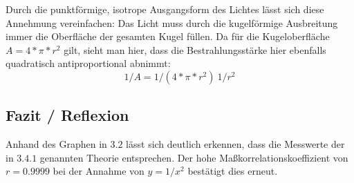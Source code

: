\documentclass[12pt, a4paper]{article}
\begin{document}
Durch die punktförmige, isotrope Ausgangsform des Lichtes lässt sich diese Annehmung vereinfachen:
Das Licht muss durch die kugelförmige Ausbreitung immer die Oberfläche der gesamten Kugel füllen. Da für die Kugeloberfläche $A=4*\pi*r^2$ gilt, sieht man hier, dass die Bestrahlungsstärke hier ebenfalls quadratisch antiproportional abnimmt:
$$1/A = 1/(4 * \pi * r^2) ~ 1/r^2$$

\subsection{Fazit / Reflexion}
Anhand des Graphen in $3.2$ lässt sich deutlich erkennen, dass die Messwerte der in $3.4.1$ genannten Theorie entsprechen.
Der hohe Maßkorrelationskoeffizient von $r = 0.9999$ bei der Annahme von $y=1/x^2$ bestätigt dies erneut. 
\end{document}
